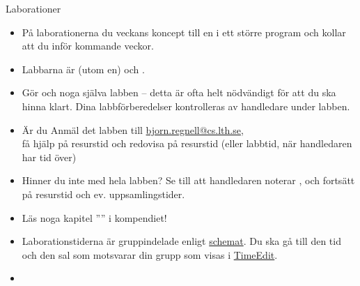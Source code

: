 \begin{SlideExtra}{Laborationer}\SlideFontSmall
\begin{itemize}
\item På laborationerna  du veckans koncept till en  i ett större program och kollar att du  inför kommande veckor.
\item Labbarna är  (utom en) och .

\item Gör  och  noga  själva labben -- detta är ofta helt nödvändigt för att du ska hinna klart. Dina labbförberedelser kontrolleras av handledare under labben.

\item Är du  Anmäl det  labben till \url{bjorn.regnell@cs.lth.se}, \\ få hjälp på resurstid och redovisa på resurstid (eller labbtid, när handledaren har tid över)

\item Hinner du inte med hela labben? Se till att handledaren noterar , och fortsätt på resurstid och ev. uppsamlingstider.

\item Läs noga kapitel '''' i kompendiet!

\item Laborationstiderna är gruppindelade enligt \href{http://cs.lth.se/pgk/schema/}{schemat}. Du ska gå till den tid och den sal som motsvarar din grupp som visas i \href{http://cs.lth.se/pgk/schema/timeedit/}{TimeEdit}.\\
\item {}
\end{itemize}
\end{SlideExtra}




